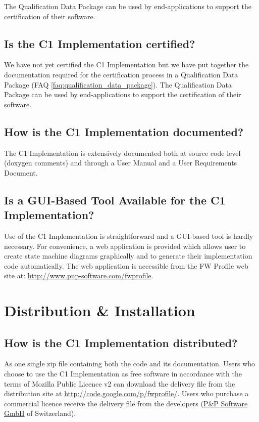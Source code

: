\documentclass[a4paper,10pt]{article}
\let\stdsection\section
\renewcommand\section{\newpage\stdsection}
\begin{document}
The Qualification Data Package can be used by end-applications to support 
the certification of their software.

\subsection{Is the C1 Implementation certified?}
We have not yet certified the C1 Implementation but we have put together the documentation required for the certification process in a Qualification 
Data Package (FAQ \ref{faq:qualification_data_package}). The Qualification Data Package  can be used by end-applications to support the certification of their software.

\subsection{How is the C1 Implementation documented?}
The C1 Implementation is extensively documented both at source code level (doxygen comments) and through a User Manual and a User Requirements Document.

\subsection{Is a GUI-Based Tool Available for the C1 Implementation?}
Use of the C1 Implementation is straightforward and a GUI-based tool is hardly necessary. For convenience, a web application is provided which allows user to create state machine diagrams graphically and to generate their implementation code automatically. The web application is accessible from the FW Profile web site at: \url{http://www.pnp-software.com/fwprofile}.


\section{Distribution \& Installation}

\subsection{How is the C1 Implementation distributed?}
As one single zip file containing both the code and its documentation. Users who choose to use the C1 Implementation as free software in accordance with the terms of Mozilla Public Licence v2 can download the delivery file from the distribution site at \url{http://code.google.com/p/fwprofile/}. Users who purchase a commercial licence receive the delivery file from the developers (\href{http://www.pnp-software.com/}{P\&P Software GmbH} of Switzerland).
\end{document}
